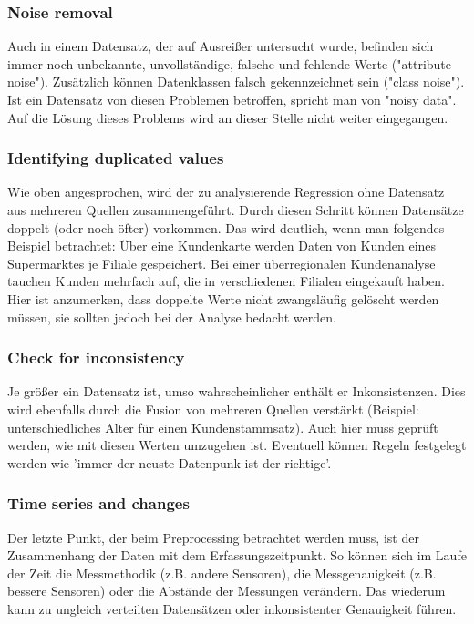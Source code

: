 \subsubsection{Noise removal}
Auch in einem Datensatz, der auf Ausreißer untersucht wurde, befinden sich immer noch unbekannte, unvollständige, falsche und fehlende Werte ("attribute noise"). Zusätzlich können Datenklassen falsch gekennzeichnet sein ("class noise"). Ist ein Datensatz von diesen Problemen betroffen, spricht man von "noisy data". Auf die Lösung dieses Problems wird an dieser Stelle nicht weiter eingegangen. 

\subsubsection{Identifying duplicated values}
Wie oben angesprochen, wird der zu analysierende Regression ohne Datensatz aus mehreren Quellen zusammengeführt. Durch diesen Schritt können Datensätze doppelt (oder noch öfter) vorkommen. Das wird deutlich, wenn man folgendes Beispiel betrachtet: \newline
Über eine Kundenkarte werden Daten von Kunden eines Supermarktes je Filiale gespeichert. Bei einer überregionalen Kundenanalyse tauchen Kunden mehrfach auf, die in verschiedenen Filialen eingekauft haben. Hier ist anzumerken, dass doppelte Werte nicht zwangsläufig gelöscht werden müssen, sie sollten jedoch bei der Analyse bedacht werden.

\subsubsection{Check for inconsistency}
Je größer ein Datensatz ist, umso wahrscheinlicher enthält er Inkonsistenzen. Dies wird ebenfalls durch die Fusion von mehreren Quellen verstärkt (Beispiel: unterschiedliches Alter für einen Kundenstammsatz). Auch hier muss geprüft werden, wie mit diesen Werten umzugehen ist. Eventuell können Regeln festgelegt werden wie 'immer der neuste Datenpunk ist der richtige'.

\subsubsection{Time series and changes}
Der letzte Punkt, der beim Preprocessing betrachtet werden muss, ist der Zusammenhang der Daten mit dem Erfassungszeitpunkt. So können sich im Laufe der Zeit die Messmethodik (z.B. andere Sensoren), die Messgenauigkeit (z.B. bessere Sensoren) oder die Abstände der Messungen verändern. Das wiederum kann zu ungleich verteilten Datensätzen oder inkonsistenter Genauigkeit führen.

